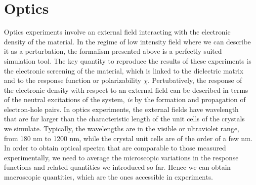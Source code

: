 \section{Optics}
Optics experiments involve an external field interacting with the electronic density of the material. In the regime of low intensity field where we can describe it as a perturbation, the formalism presented above is a perfectly suited simulation tool. The key quantity to reproduce the results of these experiments is the electronic screening of the material, which is linked to the dielectric matrix and to the response function or polarizability $\chi$. Pertubatively, the response of the electronic density with respect to an external field can be described in terms of the neutral excitations of the system, \textit{ie} by the formation and propagation of electron-hole pairs.
In optics experiments, the external fields have wavelength that are far larger than the characteristic length of the unit cells of the crystals we simulate. Typically, the wavelengths are in the visible or ultraviolet range, from 180 nm to 1200 nm, while the crystal unit cells are of the order of a few nm. 
In order to obtain optical spectra that are comparable to those measured experimentally, we need to average the microscopic variations in the response functions and related quantities we introduced so far. Hence we can obtain macroscopic quantities, which are the ones accessible in experiments. 

